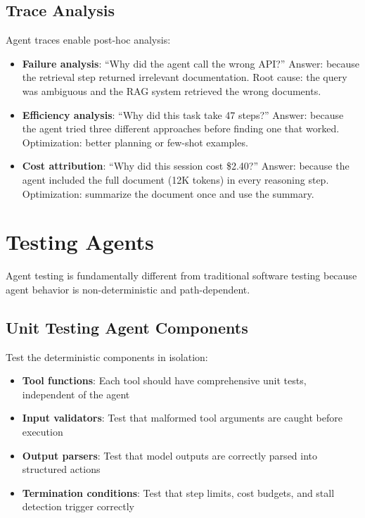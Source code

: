 \subsection{Trace Analysis}

Agent traces enable post-hoc analysis:

\begin{itemize}[leftmargin=*]
    \item \textbf{Failure analysis}: ``Why did the agent call the wrong API?'' Answer: because the retrieval step returned irrelevant documentation. Root cause: the query was ambiguous and the RAG system retrieved the wrong documents.
    \item \textbf{Efficiency analysis}: ``Why did this task take 47 steps?'' Answer: because the agent tried three different approaches before finding one that worked. Optimization: better planning or few-shot examples.
    \item \textbf{Cost attribution}: ``Why did this session cost \$2.40?'' Answer: because the agent included the full document (12K tokens) in every reasoning step. Optimization: summarize the document once and use the summary.
\end{itemize}


\section{Testing Agents}

Agent testing is fundamentally different from traditional software testing because agent behavior is non-deterministic and path-dependent.

\subsection{Unit Testing Agent Components}

Test the deterministic components in isolation:

\begin{itemize}[leftmargin=*]
    \item \textbf{Tool functions}: Each tool should have comprehensive unit tests, independent of the agent
    \item \textbf{Input validators}: Test that malformed tool arguments are caught before execution
    \item \textbf{Output parsers}: Test that model outputs are correctly parsed into structured actions
    \item \textbf{Termination conditions}: Test that step limits, cost budgets, and stall detection trigger correctly
\end{itemize}

